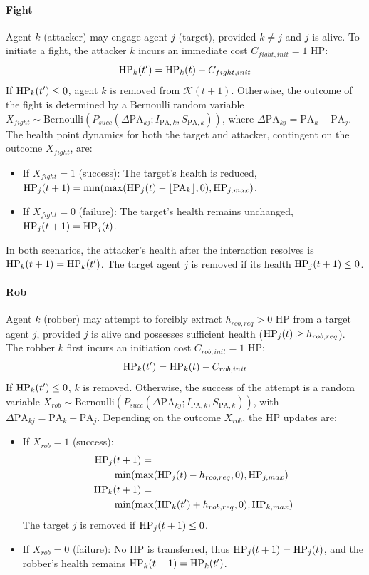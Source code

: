 \paragraph{Fight}
Agent $k$ (attacker) may engage agent $j$ (target), provided $k \neq j$ and $j$ is alive. To initiate a fight, the attacker $k$ incurs an immediate cost $C_{fight,init} = 1$ HP:
$$ \mathrm{HP}_k(t') = \mathrm{HP}_k(t) - C_{fight,init} $$
If $\mathrm{HP}_k(t') \le 0$, agent $k$ is removed from $\mathcal{K}(t+1)$. Otherwise, the outcome of the fight is determined by a Bernoulli random variable $X_{fight} \sim \text{Bernoulli}(P_{succ}(\Delta \mathrm{PA}_{kj}; I_{\mathrm{PA},k}, S_{\mathrm{PA},k}))$, where $\Delta \mathrm{PA}_{kj} = \mathrm{PA}_k - \mathrm{PA}_j$. The health point dynamics for both the target and attacker, contingent on the outcome $X_{fight}$, are:
\begin{itemize}
    \item If $X_{fight}=1$ (success): The target's health is reduced, $\mathrm{HP}_j(t+1) = \min(\max(\mathrm{HP}_j(t) - \lfloor \mathrm{PA}_k \rfloor, 0), \mathrm{HP}_{j,max})$.
    \item If $X_{fight}=0$ (failure): The target's health remains unchanged, $\mathrm{HP}_j(t+1) = \mathrm{HP}_j(t)$.
\end{itemize}
In both scenarios, the attacker's health after the interaction resolves is $\mathrm{HP}_k(t+1) = \mathrm{HP}_k(t')$. The target agent $j$ is removed if its health $\mathrm{HP}_j(t+1) \le 0$.

\paragraph{Rob}
Agent $k$ (robber) may attempt to forcibly extract $h_{rob,req} > 0$ HP from a target agent $j$, provided $j$ is alive and possesses sufficient health ($\mathrm{HP}_j(t) \ge h_{rob,req}$). The robber $k$ first incurs an initiation cost $C_{rob,init} = 1$ HP:
$$ \mathrm{HP}_k(t') = \mathrm{HP}_k(t) - C_{rob,init} $$
If $\mathrm{HP}_k(t') \le 0$, $k$ is removed. Otherwise, the success of the attempt is a random variable $X_{rob} \sim \text{Bernoulli}(P_{succ}(\Delta \mathrm{PA}_{kj}; I_{\mathrm{PA},k}, S_{\mathrm{PA},k}))$, with $\Delta \mathrm{PA}_{kj} = \mathrm{PA}_k - \mathrm{PA}_j$. Depending on the outcome $X_{rob}$, the HP updates are:
\begin{itemize}
    \item If $X_{rob}=1$ (success):
    \begin{align*}
        \mathrm{HP}_j&(t+1) = \\&\min(\max(\mathrm{HP}_j(t) - h_{rob,req}, 0), \mathrm{HP}_{j,max}) \\
        \mathrm{HP}_k&(t+1) = \\&\min(\max(\mathrm{HP}_k(t') + h_{rob,req}, 0), \mathrm{HP}_{k,max})
    \end{align*}
    The target $j$ is removed if $\mathrm{HP}_j(t+1) \le 0$.
    \item If $X_{rob}=0$ (failure): No HP is transferred, thus $\mathrm{HP}_j(t+1) = \mathrm{HP}_j(t)$, and the robber's health remains $\mathrm{HP}_k(t+1) = \mathrm{HP}_k(t')$.
\end{itemize}

